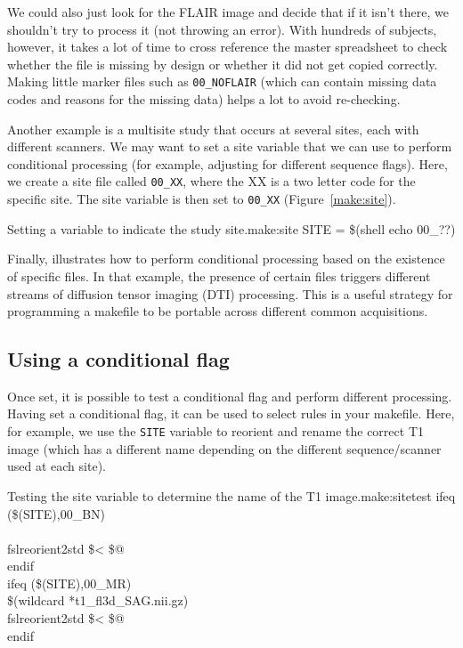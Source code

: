 We could also just look for the FLAIR image and decide that if it isn't there, we shouldn't try to process it (not throwing an error). With hundreds of subjects, however, it takes a lot of time to cross reference the master spreadsheet to check whether the file is missing by design or whether it did not get copied correctly. Making little marker files such as \texttt{00\_NOFLAIR} (which can contain missing data codes and reasons for the missing data) helps a lot to avoid re-checking.  

Another example is a multisite study that occurs at several sites, each with different scanners. We may want to set a site variable that we can use to perform conditional processing (for example, adjusting for different sequence flags). Here, we create a site file called \texttt{00\_XX}, where the XX is a two letter code for the specific site. The site variable is then set to \texttt{00\_XX} (Figure~\ref{make:site}).

\begin{make}{Setting a variable to indicate the study site.}{make:site}
SITE = \$(shell echo 00\_??)
\end{make}

Finally,  illustrates how to perform conditional processing based on the existence of specific files. In that example, the presence of certain files triggers different streams of diffusion tensor imaging (DTI) processing. This is a useful strategy for programming a makefile to be portable across different common acquisitions. 

\subsection{Using a conditional flag}
Once set, it is possible to test a conditional flag and perform different processing. Having set a conditional flag, it can be used to select rules in your makefile. Here, for example, we use the \texttt{SITE} variable to reorient and rename the correct T1 image (which has a different name depending on the different sequence/scanner used at each site). 

\begin{make}{Testing the site variable to determine the name of the T1 image.}{make:sitetest}
ifeq (\$(SITE),00_BN) \\
\\
     \tab fslreorient2std \$< \$@    \\
endif \\

ifeq (\$(SITE),00_MR) \\
 {\$(wildcard *t1_fl3d_SAG.nii.gz)} \\
    \tab  fslreorient2std \$< \$@    \\
endif
\end{make}


